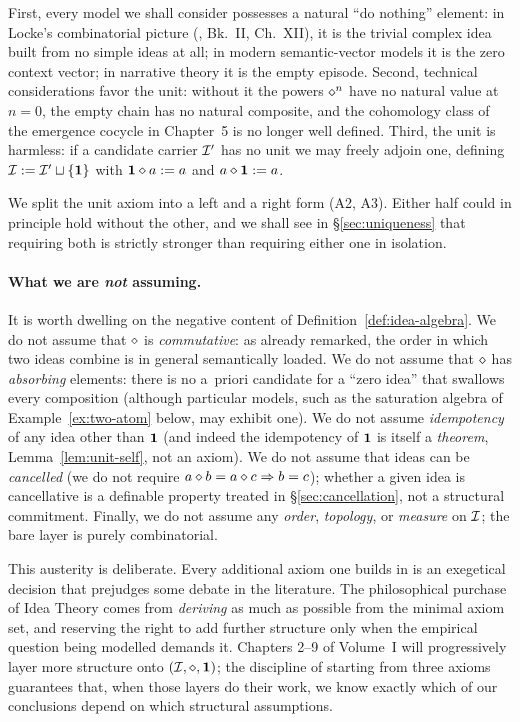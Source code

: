 First, every model we shall consider possesses a natural ``do nothing''
element: in Locke's combinatorial picture (\cite{Locke1690}, Bk.~II,
Ch.~XII), it is the trivial complex idea built from no simple ideas at
all; in modern semantic-vector models it is the zero context vector; in
narrative theory it is the empty episode.  Second, technical considerations
favor the unit: without it the powers $\mathbin{\diamond}^n$ have no natural value
at $n=0$, the empty chain has no natural composite, and the cohomology
class of the emergence cocycle in Chapter~5 is no longer well defined.
Third, the unit is harmless: if a candidate carrier $\mathcal{I}'$ has no unit
we may freely adjoin one, defining $\mathcal{I} \mathrel{:=} \mathcal{I}' \sqcup \{\mathbf{1}\}$
with $\mathbf{1} \mathbin{\diamond} a \mathrel{:=} a$ and $a \mathbin{\diamond} \mathbf{1} \mathrel{:=} a$.

We split the unit axiom into a left and a right form (A2, A3).  Either
half could in principle hold without the other, and we shall see in
\S\ref{sec:uniqueness} that requiring both is strictly stronger than
requiring either one in isolation.

\paragraph{What we are \emph{not} assuming.}
It is worth dwelling on the negative content of
Definition~\ref{def:idea-algebra}.  We do not assume that $\mathbin{\diamond}$ is
\emph{commutative}: as already remarked, the order in which two ideas
combine is in general semantically loaded.  We do not assume that
$\mathbin{\diamond}$ has \emph{absorbing} elements: there is no a~priori candidate
for a ``zero idea'' that swallows every composition (although particular
models, such as the saturation algebra of Example~\ref{ex:two-atom}
below, may exhibit one).  We do not assume \emph{idempotency} of any idea
other than $\mathbf{1}$ (and indeed the idempotency of $\mathbf{1}$ is itself a
\emph{theorem}, Lemma~\ref{lem:unit-self}, not an axiom).  We do not
assume that ideas can be \emph{cancelled} (we do not require $a \mathbin{\diamond}
b = a \mathbin{\diamond} c \Rightarrow b = c$); whether a given idea is
cancellative is a definable property treated in
\S\ref{sec:cancellation}, not a structural commitment.  Finally, we do
not assume any \emph{order}, \emph{topology}, or \emph{measure} on
$\mathcal{I}$; the bare layer is purely combinatorial.

This austerity is deliberate.  Every additional axiom one builds in is an
exegetical decision that prejudges some debate in the literature.  The
philosophical purchase of Idea Theory comes from \emph{deriving} as much
as possible from the minimal axiom set, and reserving the right to add
further structure only when the empirical question being modelled
demands it.  Chapters 2--9 of Volume~I will progressively layer more
structure onto $(\mathcal{I},\mathbin{\diamond},\mathbf{1})$; the discipline of starting from three axioms
guarantees that, when those layers do their work, we know exactly which
of our conclusions depend on which structural assumptions.

